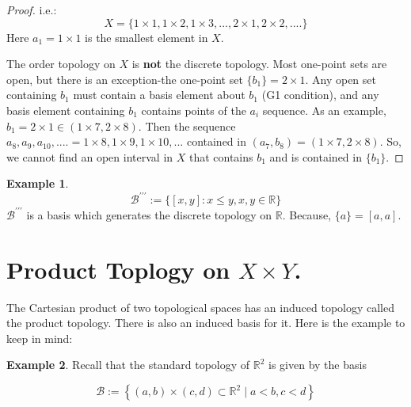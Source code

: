 \documentclass[
]{book}
\theoremstyle{definition}
\theoremstyle{definition}
\newtheorem{example}{Example}[chapter]
\theoremstyle{definition}
\theoremstyle{definition}
\theoremstyle{remark}
\begin{document}
\begin{proof}
i.e.:\[X=\{1\times 1,1 \times 2, 1 \times 3, ..., 2\times 1, 2 \times 2, ....\}\]
Here \(a_1=1\times 1\) is the smallest element in \(X\).

The order topology on \(X\) is \textbf{not} the discrete topology. Most one-point sets are open, but there is an exception-the one-point set \(\{b_1\}={2\times 1}\). Any open set containing \(b_1\) must contain a basis element about \(b_1\) (G1 condition), and any basis element containing \(b_1\) contains points of the \(a_i\) sequence.
As an example, \(b_1=2\times 1\in (1\times 7,2\times 8)\). Then the sequence \(a_8,a_9,a_{10},....=1\times 8,1\times 9, 1\times 10,...\) contained in \((a_7,b_8)=(1\times 7,2\times 8)\). So, we cannot find an open interval in \(X\) that contains \(b_1\) and is contained in \(\{b_1\}\).
\end{proof}

\begin{example}
\protect\hypertarget{exm:unnamed-chunk-32}{}\label{exm:unnamed-chunk-32}\[\mathcal{B}^{\prime\prime\prime}:=\{[x,y]:x\leq y, x,y\in \mathbb{R}\}\]
\(\mathcal{B}^{\prime\prime\prime}\) is a basis which generates the discrete topology on \(\mathbb{R}\). Because, \(\{a\}=[a,a]\).
\end{example}

\hypertarget{product-toplogy-on-x-times-y.}{%
\section{\texorpdfstring{Product Toplogy on \(X \times Y\).}{Product Toplogy on X \textbackslash times Y.}}\label{product-toplogy-on-x-times-y.}}

The Cartesian product of two topological spaces has an induced topology called the product topology. There is also an induced basis for it. Here is the example to keep in mind:

\begin{example}
\protect\hypertarget{exm:egR2}{}\label{exm:egR2}Recall that the standard topology of \(\mathbb{R}^{2}\) is given by the basis

\[
\mathcal{B}:=\left\{(a, b) \times(c, d) \subset \mathbb{R}^{2} \mid a<b, c<d\right\}
\]
\end{example}
\end{document}
